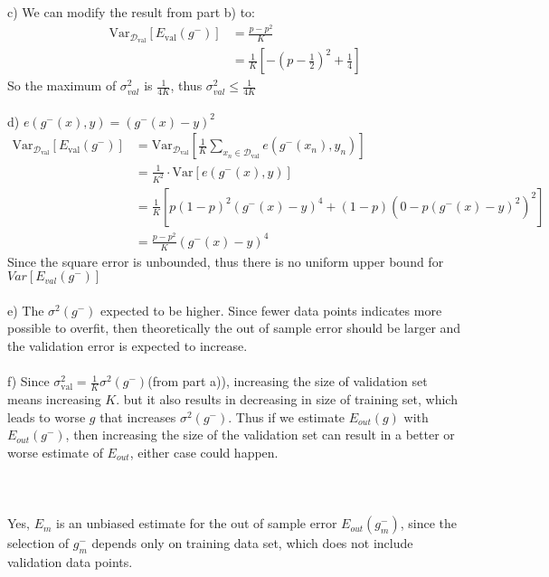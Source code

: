 \documentclass[12pt]{article}
\begin{document}
\indent c) We can modify the result from part b) to:
\begin{align*}
\mathrm{Var}_{\mathcal{D}_\mathrm{val}}\left[E_{\mathrm{val}}(g^-)\right] &= \frac{p - p^2}{K}\\
&=\frac{1}{K}\left[-(p-\frac{1}{2})^2+\frac{1}{4}\right]
\end{align*}
So the maximum of $\sigma^2_{val}$ is $\displaystyle \frac{1}{4K}$, thus $\displaystyle \sigma^2_{val} \leq \frac{1}{4K}$\\\\
\indent d) $e(g^-(x),y) = (g^-(x)-y)^2$ 
\begin{align*}
\mathrm{Var}_{\mathcal{D}_\mathrm{val}}\left[E_{\mathrm{val}}(g^-)\right] &= \mathrm{Var}_{\mathcal{D}_\mathrm{val}}\left[\frac{1}{K}\sum_{  {x}_n\in\mathcal{D}_{\mathrm{val}}}  {e}(g^-(  {x}_n), y_n)\right] \\
&= \frac{1}{K^2} \cdot \mathrm{Var}\left[  {e}(g^-(  {x}), y)\right] \\
&= \frac{1}{K} \left[ p(1-p)^2(g^-(x)-y)^4+(1-p)(0-p(g^-(x)-y)^2)^2 \right]\\
& = \frac{p - p^2}{K}(g^-(x)-y)^4
\end{align*}
Since the square error is unbounded, thus there is no uniform upper bound for $Var\left[E_{val}(g^-)\right]$\\\\
\indent e) The $\sigma^2(g^-)$ expected to be higher. Since fewer data points indicates more possible to overfit, then theoretically the out of sample error should be larger and the validation error is expected to increase.\\\\
\indent f) Since $\displaystyle\sigma_{\mathrm{val}}^2 = \frac{1}{K}\sigma^2(g^-)$(from part a)), increasing the size of validation set means increasing $K$. but it also results in decreasing in size of training set, which leads to worse $g$ that increases $\sigma^2(g^-)$. Thus if we estimate $E_{out}(g)$ with $E_{out}(g^-)$, then increasing the size of the validation set can result in a better or worse estimate of $E_{out}$, either case could happen.\\\\

 \\\\
\indent Yes, $E_m$ is an unbiased estimate for the out of sample error $E_{out}(g^-_m)$, since the selection of $g^-_m$ depends only on training data set, which does not include validation data points. \\\\
\end{document}
